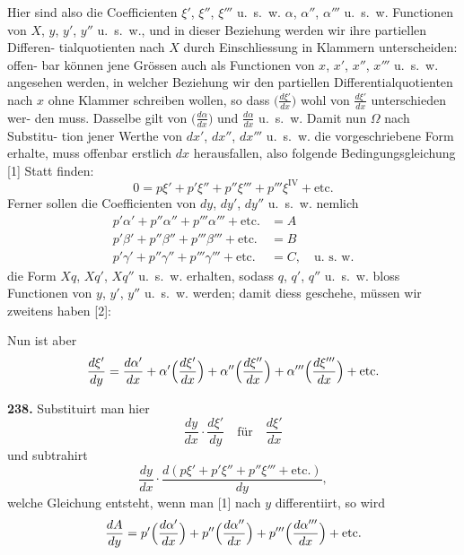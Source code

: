 \documentclass[12pt,a4paper]{article}
\begin{document}
\smallskip\noindent
Hier sind also die Coefficienten $\xi'$, $\xi''$, $\xi'''$ u.~s.~w. $\alpha$, $\alpha''$, $\alpha'''$ u.~s.~w. Functionen von
$X$, $y$, $y'$, $y''$ u.~s.~w., und in dieser Beziehung werden wir ihre partiellen Differen-
tialquotienten nach $X$ durch Einschliessung in Klammern unterscheiden: offen-
bar können jene Grössen auch als Functionen von $x$, $x'$, $x''$, $x'''$ u.~s.~w. angesehen
werden, in welcher Beziehung wir den partiellen Differentialquotienten nach $x$
ohne Klammer schreiben wollen, so dass $\bigl(\frac{d\xi'}{dx}\bigr)$ wohl von $\frac{d\xi'}{dx}$ unterschieden wer-
den muss. Dasselbe gilt von $\bigl(\frac{d\alpha}{dx}\bigr)$ und $\frac{d\alpha}{dx}$ u.~s.~w. Damit nun $\Omega$ nach Substitu-
tion jener Werthe von $dx'$, $dx''$, $dx'''$ u.~s.~w. die vorgeschriebene Form erhalte,
muss offenbar erstlich $dx$ herausfallen, also folgende Bedingungsgleichung [1]
Statt finden:
\begin{equation*}
0 = p\xi' + p'\xi'' + p''\xi''' + p'''\xi^{\mathrm{IV}} + \text{etc.}
\end{equation*}
Ferner sollen die Coefficienten von $dy$, $dy'$, $dy''$ u.~s.~w. nemlich
\begin{align*}
p'\alpha' + p''\alpha'' + p'''\alpha''' + \text{etc.} &= A \\
p'\beta' + p''\beta'' + p'''\beta''' + \text{etc.} &= B \\
p'\gamma' + p''\gamma'' + p'''\gamma''' + \text{etc.} &= C, \quad \text{u.~s.~w.}
\end{align*}
die Form $Xq$, $Xq'$, $Xq''$ u.~s.~w. erhalten, sodass $q$, $q'$, $q''$ u.~s.~w. bloss Functionen
von $y$, $y'$, $y''$ u.~s.~w. werden; damit diess geschehe, müssen wir zweitens haben [2]:

\smallskip\noindent
Nun ist aber
\begin{equation*}
\frac{d\xi'}{dy} = \frac{d\alpha'}{dx} + \alpha'\Bigl(\frac{d\xi'}{dx}\Bigr) + \alpha''\Bigl(\frac{d\xi''}{dx}\Bigr) + \alpha'''\Bigl(\frac{d\xi'''}{dx}\Bigr) + \text{etc.}
\end{equation*}

\noindent\textbf{238.}\quad
Substituirt man hier
\begin{equation*}
\frac{dy}{dx}\cdot\frac{d\xi'}{dy} \quad \text{für} \quad \frac{d\xi'}{dx}
\end{equation*}
und subtrahirt
\begin{equation*}
\frac{dy}{dx}\cdot\frac{d(p\xi'+p'\xi''+p''\xi'''+\text{etc.})}{dy},
\end{equation*}
welche Gleichung entsteht, wenn man [1] nach $y$ differentiirt, so wird
\begin{equation*}
\frac{dA}{dy} = p'\Bigl(\frac{d\alpha'}{dx}\Bigr) + p''\Bigl(\frac{d\alpha''}{dx}\Bigr) + p'''\Bigl(\frac{d\alpha'''}{dx}\Bigr) + \text{etc.}
\end{equation*}
\end{document}
